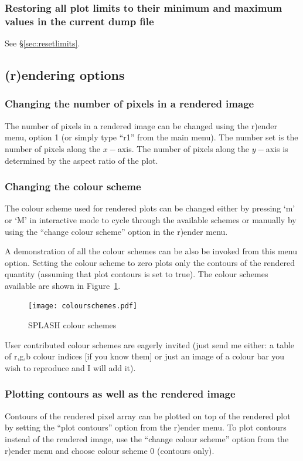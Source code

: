 \documentclass[a4paper,11pt]{article}
\begin{document}
\subsubsection{ Restoring all plot limits to their minimum and maximum values in the current dump file}
See \S\ref{sec:resetlimits}.

\subsection{(r)endering options}
\subsubsection{ Changing the number of pixels in a rendered image}
 The number of pixels in a rendered image can be changed using the r)ender menu, option 1 (or simply type ``r1'' from the main menu). The number set is the number of pixels along the
$x-$axis. The number of pixels along the $y-$axis is determined by the aspect ratio of the plot.

\subsubsection{ Changing the colour scheme}
 The colour scheme used for rendered plots can be changed either by pressing `m' or `M' in interactive mode to cycle through the available schemes or manually by using the ``change colour scheme'' option in the r)ender menu.

 A demonstration of all the colour schemes can be also be invoked from
this menu option. Setting the colour scheme to zero plots only the contours of
the rendered quantity (assuming that plot contours is set to true). The colour
schemes available are shown in Figure~\ref{fig:colourschemes}.
\begin{figure}
\begin{center}
\texttt{[image: colourschemes.pdf]}
\caption{SPLASH colour schemes}
\label{fig:colourschemes}
\end{center}
\end{figure}

 User contributed colour schemes are eagerly invited (just send me either: a table of r,g,b colour indices [if you know them] or just an image of a colour bar you wish to reproduce and I will add it).

\subsubsection{ Plotting contours as well as the rendered image}
 Contours of the rendered pixel array can be plotted on top of the rendered plot by setting the ``plot contours'' option from the r)ender menu. To plot contours instead of the rendered image, use the ``change colour scheme'' option from the r)ender menu and choose colour scheme 0 (contours only). 
\end{document}
